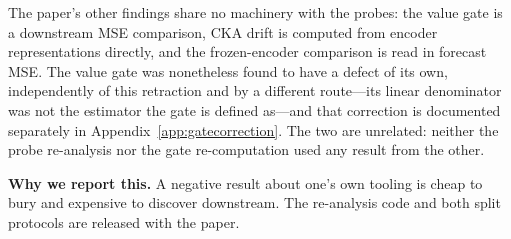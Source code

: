 The paper's other findings share no machinery with the probes: the value gate
is a downstream MSE comparison, CKA drift is computed from encoder
representations directly, and the frozen-encoder comparison is read in
forecast MSE.  The value gate was nonetheless found to have a defect of its
own, independently of this retraction and by a different route---its linear
denominator was not the estimator the gate is defined as---and that correction
is documented separately in Appendix~\ref{app:gatecorrection}.  The two are
unrelated: neither the probe re-analysis nor the gate re-computation used any
result from the other.

\textbf{Why we report this.} A negative result about one's own tooling is
cheap to bury and expensive to discover downstream. The re-analysis code and
both split protocols are released with the paper.
